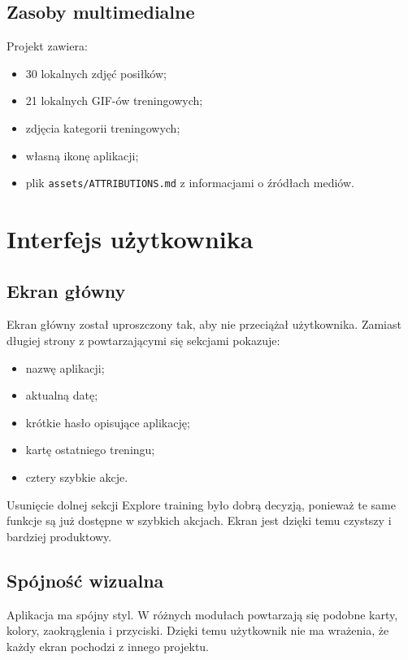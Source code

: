\documentclass[12pt,a4paper]{article}
\begin{document}
\subsection{Zasoby multimedialne}

Projekt zawiera:

\begin{itemize}
    \item 30 lokalnych zdjęć posiłków;
    \item 21 lokalnych GIF-ów treningowych;
    \item zdjęcia kategorii treningowych;
    \item własną ikonę aplikacji;
    \item plik \texttt{assets/ATTRIBUTIONS.md} z informacjami o źródłach mediów.
\end{itemize}

\section{Interfejs użytkownika}

\subsection{Ekran główny}

Ekran główny został uproszczony tak, aby nie przeciążał użytkownika. Zamiast długiej strony z powtarzającymi się sekcjami pokazuje:

\begin{itemize}
    \item nazwę aplikacji;
    \item aktualną datę;
    \item krótkie hasło opisujące aplikację;
    \item kartę ostatniego treningu;
    \item cztery szybkie akcje.
\end{itemize}

Usunięcie dolnej sekcji Explore training było dobrą decyzją, ponieważ te same funkcje są już dostępne w szybkich akcjach. Ekran jest dzięki temu czystszy i bardziej produktowy.

\subsection{Spójność wizualna}

Aplikacja ma spójny styl. W różnych modułach powtarzają się podobne karty, kolory, zaokrąglenia i przyciski. Dzięki temu użytkownik nie ma wrażenia, że każdy ekran pochodzi z innego projektu.
\end{document}
